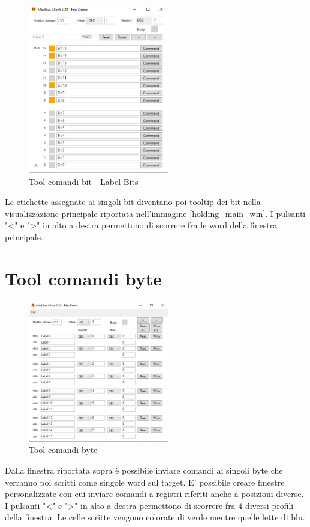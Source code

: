 \begin{figure}[H]
\centering
\includegraphics[width=0.55\textwidth]{../Img/Tool_Command_Bit_Label.PNG}
\caption{Tool comandi bit - Label Bits}
\end{figure}

Le etichette assegnate ai singoli bit diventano poi tooltip dei bit nella visualizzazione
principale riportata nell'immagine \ref{holding_main_win}. I pulsanti "<" e ">" in alto a destra permettono
di scorrere fra le word della finestra principale.

\section{Tool comandi byte}

\begin{figure}[H]
\centering
\includegraphics[width=0.55\textwidth]{../Img/Tool_Command_Byte.PNG}
\caption{Tool comandi byte}
\end{figure}

Dalla finestra riportata sopra è possibile inviare comandi ai singoli byte che verranno poi
scritti come singole word sul target. E' possibile creare finestre personalizzate con cui inviare
comandi a registri riferiti anche a posizioni diverse. I pulsanti "<" e ">" in alto a destra permettono
di scorrere fra 4 diversi profili della finestra.
Le celle scritte vengono colorate di verde mentre quelle lette di blu.

